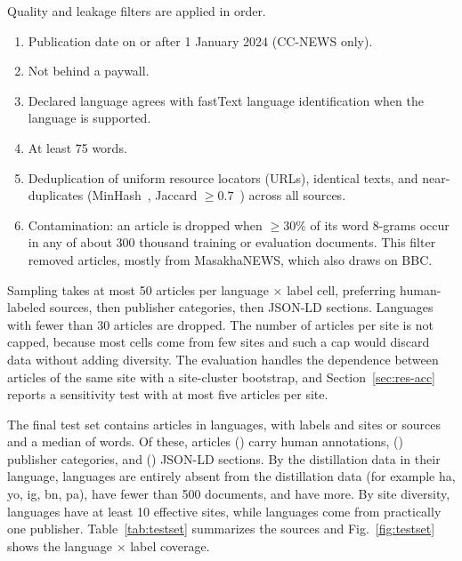 Quality and leakage filters are applied in order.
\begin{enumerate}
  \item Publication date on or after 1 January 2024 (CC-NEWS only).
  \item Not behind a paywall.
  \item Declared language agrees with fastText language identification when the language is supported.
  \item At least 75 words.
  \item Deduplication of uniform resource locators (URLs), identical texts, and near-duplicates (MinHash~\cite{broder1997resemblance}, Jaccard $\ge 0.7$~\cite{lee2022dedup}) across all sources.
  \item Contamination: an article is dropped when $\ge 30\%$ of its word 8-grams occur in any of about 300 thousand training or evaluation documents. This filter removed  articles, mostly from MasakhaNEWS, which also draws on BBC.
\end{enumerate}

Sampling takes at most 50 articles per language $\times$ label cell, preferring human-labeled sources, then publisher categories, then JSON-LD sections. Languages with fewer than 30 articles are dropped. The number of articles per site is not capped, because most cells come from few sites and such a cap would discard data without adding diversity. The evaluation handles the dependence between articles of the same site with a site-cluster bootstrap, and Section~\ref{sec:res-acc} reports a sensitivity test with at most five articles per site.

The final test set contains  articles in  languages, with  labels and  sites or sources and a median of  words. Of these,  articles () carry human annotations,  () publisher categories, and  () JSON-LD sections. By the distillation data in their language,  languages are entirely absent from the distillation data (for example ha, yo, ig, bn, pa),  have fewer than 500 documents, and  have more. By site diversity,  languages have at least 10 effective sites, while  languages come from practically one publisher. Table~\ref{tab:testset} summarizes the sources and Fig.~\ref{fig:testset} shows the language $\times$ label coverage.

